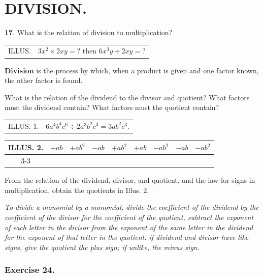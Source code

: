 \documentclass{book}
\begin{document}
\section*{DIVISION.}

\textbf{17}. What is the relation of division to multiplication?

\begin{tabular}{ll}
ILLUS. & $3x^2 \times 2xy = $? then $6x^3y \div {2xy}= $?\\
\end{tabular}

\textbf{Division} is the process by which, when a product is given
and one factor known, the other factor is found.

What is the relation of the dividend to the divisor and quotient?
What factors must the dividend contain? What factors must the
quotient contain?

\begin{tabular}{c c}
ILLUS. 1.& $6a^4 b^4 c^6 \div 2a^3 b^2 c^3 = 3a b^2 c^3$.\\
\end{tabular}
\begin{center}
\begin{tabular}{c c|cc|cc|cc|c}
ILLUS. 2. & $+ab $&$+ab^2$& $-ab $&$+ab^2$& $+ab $&$-ab^2$& $-ab $&$-ab^2$\\
\cline{3-3}\cline{5-5}\cline{7-7}\cline{9-9}\\
\end{tabular}
\end{center}


From the relation of the dividend, divisor, and quotient, and the
law for signs in multiplication, obtain the quotients in Illus. 2.

\textit{To divide a monomial by a monomial, divide
the coefficient of the dividend by the coefficient
of the divisor for the coefficient of the quotient,
subtract the exponent of each letter in the divisor
from the exponent of the same letter in the dividend
for the exponent of that letter in the quotient: if
dividend and divisor have like signs, give the quotient
the plus sign; if unlike, the minus sign.}

\subsubsection*{Exercise 24.}
\end{document}
